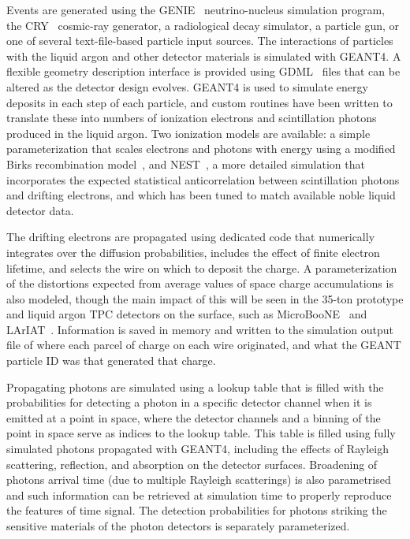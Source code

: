Events are generated using the GENIE~\cite{genie} neutrino-nucleus
simulation program, the CRY~\cite{cry} cosmic-ray generator, a
radiological decay simulator, a particle gun, or one of several
text-file-based particle input sources.  The interactions of particles
with the liquid argon and other detector materials is simulated with
GEANT4.  A flexible geometry description interface is provided using
GDML~\cite{gdml} files that can be altered as the detector design
evolves.  GEANT4 is used to simulate energy deposits in each step of
each particle, and custom routines have been written to translate
these into numbers of ionization electrons and scintillation photons
produced in the liquid argon.  Two ionization models are available: a
simple parameterization that scales electrons and photons with energy
using a modified Birks recombination model~\cite{birks}, and
NEST~\cite{nest}, a more detailed simulation that incorporates the
expected statistical anticorrelation between scintillation photons and
drifting electrons, and which has been tuned to match available noble
liquid detector data.


The drifting electrons are propagated using dedicated code that
numerically integrates over the diffusion probabilities, includes the
effect of finite electron lifetime, and selects the wire on which to
deposit the charge.  A parameterization of the distortions expected
from average values of space charge accumulations is also modeled,
though the main impact of this will be seen in the 35-ton prototype
and liquid argon TPC detectors on the surface, such as
MicroBooNE~\cite{microboone} and LArIAT~\cite{lariat}.  Information is
saved in memory and written to the simulation output file of where
each parcel of charge on each wire originated, and what the GEANT
particle ID was that generated that charge.

Propagating photons are simulated using a lookup table that is filled
with the probabilities for detecting a photon in a specific detector channel
when it is emitted at a point in space, where the detector channels
and a binning of the point in space serve as indices to the lookup table.
This table is filled using fully simulated photons propagated with GEANT4, including the effects
of Rayleigh scattering, reflection, and absorption on the detector
surfaces.  
Broadening of  photons arrival time (due to multiple Rayleigh scatterings)
is also parametrised and such information can be retrieved at simulation time
to properly reproduce the features of time signal.
The detection probabilities for photons striking the
sensitive materials of the photon detectors is separately
parameterized.

